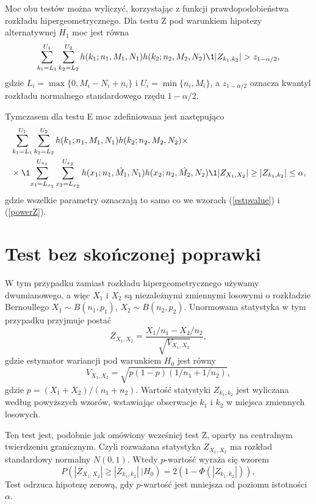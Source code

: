 Moc obu testów można wyliczyć, korzystając z funkcji prawdopodobieństwa rozkładu hipergeometrycznego. Dla testu Z pod warunkiem hipotezy alternatywnej $H_1$ moc jest równa
\begin{equation}
\label{powerZ}
\sum_{k_1=L_1}^{U_1}\sum_{k_2=L_2}^{U_2} h(k_1;n_1,M_1,N_1)h(k_2;n_2,M_2,N_2)\1{|Z_{k_1,k_2}|>z_{1-\alpha/2}},
\end{equation}
gdzie $L_i=\max\{0,M_i-N_i+n_i\}$ i $U_i=\min\{n_i,M_i\}$, a $z_{1-\alpha/2}$ oznacza kwantyl rozkładu normalnego standardowego rzędu $1-\alpha/2$.

Tymczasem dla testu E moc zdefiniowana jest następująco
\begin{equation}
\begin{split}
&\sum_{k_1=L_1}^{U_1}\sum_{k_2=L_2}^{U_2} h(k_1;n_1,M_1,N_1)h(k_2;n_2,M_2,N_2) \times \\
& \times \1{\sum_{x_1=L_{x_1}}^{U_{x_1}}\sum_{x_2=L_{x_2}}^{U_{x_2}} h(x_1;n_1,\hat{M_1},N_1)h(x_2;n_2,\hat{M_2},N_2) \1{|Z_{X_1,X_2}|\geq|Z_{k_1,k_2}|}\leq\alpha },
\end{split}
\end{equation}
gdzie wszelkie parametry oznaczają to samo co we wzorach (\ref{estpvalue}) i (\ref{powerZ}).

\section{Test bez skończonej poprawki}
W tym przypadku zamiast rozkładu hipergeometrycznego używamy dwumianowego, a więc $X_1$ i $X_2$ są niezależnymi zmiennymi losowymi o rozkładzie Bernoullego $X_1\sim B(n_1,p_1)$, $X_2\sim B(n_2,p_2)$. Unormowana statystyka w tym przypadku przyjmuje postać
\begin{equation}
Z_{X_1,X_2} = \frac{X_1/n_1-X_2/n_2}{\sqrt{V_{X_1,X_2}}},
\end{equation}
gdzie estymator wariancji pod warunkiem $H_0$ jest równy
\begin{equation}
V_{X_1,X_2} = \sqrt{p(1-p)(1/n_1+1/n_2)},
\end{equation}
gdzie $p=(X_1+X_2)/(n_1+n_2)$.
Wartość statystyki $Z_{k_1,k_2}$ jest wyliczana według powyższych wzorów, wstawiając obserwacje $k_1$ i $k_2$ w miejsca zmiennych losowych.

Ten test jest, podobnie jak omówiony wcześniej test Z, oparty na centralnym twierdzeniu granicznym. Czyli rozważana statystyka $Z_{X_1,X_2}$ ma rozkład standardowy normalny $N(0,1)$. Wtedy $p$-wartość wyraża się wzorem
\begin{equation}
P(|Z_{X_1,X_2}|\geq|Z_{k_1,k_2}|\ |H_0) = 2(1-\Phi(|Z_{k_1,k_2}|)),
\end{equation}
Test odrzuca hipotezę zerową, gdy $p$-wartość jest mniejsza od poziomu istotności $\alpha$.

